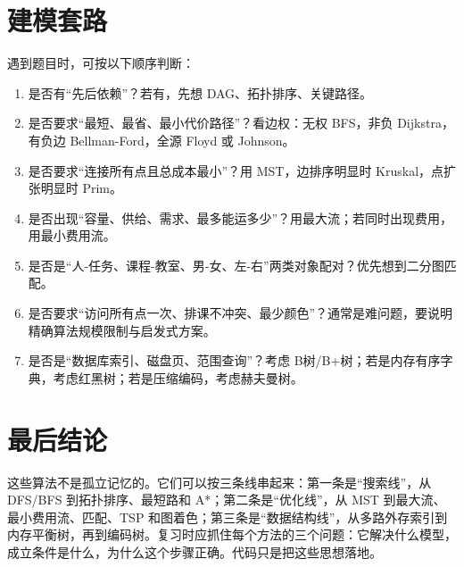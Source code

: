\documentclass[UTF8,oneside,12pt]{ctexbook}
\begin{document}
\section{建模套路}
遇到题目时，可按以下顺序判断：
\begin{enumerate}
  \item 是否有“先后依赖”？若有，先想 DAG、拓扑排序、关键路径。
  \item 是否要求“最短、最省、最小代价路径”？看边权：无权 BFS，非负 Dijkstra，有负边 Bellman-Ford，全源 Floyd 或 Johnson。
  \item 是否要求“连接所有点且总成本最小”？用 MST，边排序明显时 Kruskal，点扩张明显时 Prim。
  \item 是否出现“容量、供给、需求、最多能运多少”？用最大流；若同时出现费用，用最小费用流。
  \item 是否是“人-任务、课程-教室、男-女、左-右”两类对象配对？优先想到二分图匹配。
  \item 是否要求“访问所有点一次、排课不冲突、最少颜色”？通常是难问题，要说明精确算法规模限制与启发式方案。
  \item 是否是“数据库索引、磁盘页、范围查询”？考虑 B树/B+树；若是内存有序字典，考虑红黑树；若是压缩编码，考虑赫夫曼树。
\end{enumerate}

\section{最后结论}
这些算法不是孤立记忆的。它们可以按三条线串起来：第一条是“搜索线”，从 DFS/BFS 到拓扑排序、最短路和 A*；第二条是“优化线”，从 MST 到最大流、最小费用流、匹配、TSP 和图着色；第三条是“数据结构线”，从多路外存索引到内存平衡树，再到编码树。复习时应抓住每个方法的三个问题：它解决什么模型，成立条件是什么，为什么这个步骤正确。代码只是把这些思想落地。

\backmatter
\end{document}
